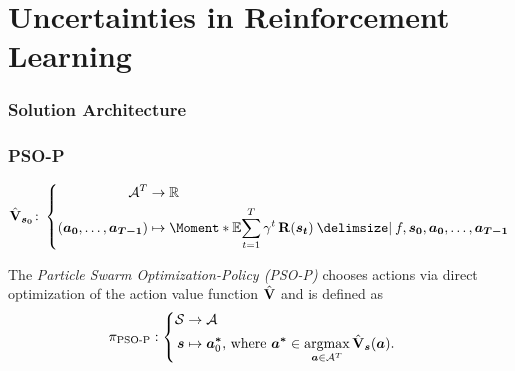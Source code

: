 \section{Uncertainties in Reinforcement Learning}
\begin{frame}[label=solution_architecture]
    \frametitle{Solution Architecture}

    \centering
    
\end{frame}

\begin{frame}[label=solution_psop]
    \frametitle{PSO-P}

    \begin{align}
        \label{eq:action_value_function}
        \AVlu_{\mat{s_0}} \colon \left\{
            \begin{aligned}
                \Ah^T &\to \R \\
                \left( \mat{a_0}, \dots, \mat{a_{T-1}} \right) &\mapsto \Moment*{\E}{\sum_{t=1}^T \gamma^t \Rwd(\mat{s_t}) \given f, \mat{s_0}, \mat{a_0}, \dots, \mat{a_{T-1}}}
            \end{aligned}
            \right.
        \end{align}

    \begin{definition}[PSO-P]
        \label{def:psop}
        The \emph{Particle Swarm Optimization-Policy (PSO-P)} chooses actions via direct optimization of the action value function $\operatorname{\hat{\operatorname{\mathbf{V}}}}$ and is defined as
        \begin{align}
            \pi_{\text{PSO-P}} &: \left\{
            \begin{aligned}
                \mathcal{S} &\to \mathcal{A}\\
                \bm{s} &\mapsto \bm{a^\ast}_0 \text{, where } \bm{a^\ast} \in \operatorname*{argmax}_{\bm{a} \in \mathcal{A}^T} \operatorname{\hat{\operatorname{\mathbf{V}}}}_{\bm{s}}(\bm{a}).
            \end{aligned}
            \right.
        \end{align}
    \end{definition}
\end{frame}

